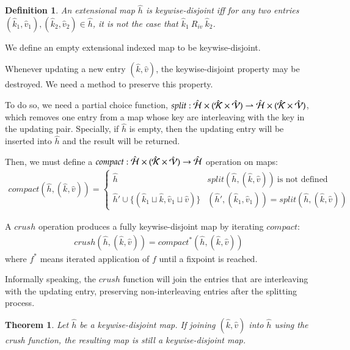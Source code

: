 \documentclass[preprint,9pt]{sigplanconf} %
\newtheorem{mdef}{Definition}
\newtheorem{mtheo}{Theorem}
\begin{document}
\begin{mdef}
An extensional map $\hat h$ is keywise-disjoint iff for any two
entries $(\hat k_1, \hat v_1), (\hat k_2, \hat v_2) \in \hat h$, it is
not the case that $\hat k_1\ R_{iv}\ \hat k_2$.
\end{mdef}

We define an empty extensional indexed map to be keywise-disjoint.

Whenever updating a new entry $(\hat k,\hat v)$, the keywise-disjoint
property may be destroyed. We need a method to preserve this property.

To do so, we need a partial choice function, 
\begin{math}
split : \hat{\mathcal{H}}
\times (\hat{\mathcal{K}} \times \hat{\mathcal{V}}) \rightharpoonup \hat{\mathcal{H}}
\times (\hat{\mathcal{K}} \times \hat{\mathcal{V}})
\end{math},
which removes one entry from a map whose key are interleaving with the
key in the updating pair. Specially, if $\hat h$ is empty, then the
updating entry will be inserted into $\hat h$ and the result will be
returned.

Then, we must define a
\begin{math}
compact : \hat{\mathcal{H}} \times (\hat{\mathcal{K}} \times \hat{\mathcal{V}}) \rightarrow \hat{\mathcal{H}}
\end{math}
operation on maps:
\begin{align*}
compact(\hat h, (\hat k, \hat v)) =
\begin{cases}
\hat h & split(\hat h, (\hat k, \hat v))\ \text{is not defined} \\
\hat h' \cup \{(\hat k_1 \sqcup \hat k, \hat v_1 \sqcup \hat v)\} &
(\hat h', (\hat k_1, \hat v_1)) = split(\hat h, (\hat k, \hat v))
\end{cases}
\end{align*}

A $crush$ operation produces a fully keywise-disjoint map by
iterating $compact$:
\begin{align*}
crush(\hat h, (\hat k, \hat v)) = compact^*(\hat h, (\hat k, \hat v))
\end{align*}
where $f^*$ means iterated application of $f$ until a fixpoint is
reached.

Informally speaking, the $crush$ function will join the entries that
are interleaving with the updating entry, preserving non-interleaving
entries after the splitting process.

\begin{mtheo}
Let $\hat h$ be a keywise-disjoint map. If joining $(\hat k, \hat v)$
into $\hat h$ using the crush function, the resulting map is still a
keywise-disjoint map.
\end{mtheo}
\end{document}
